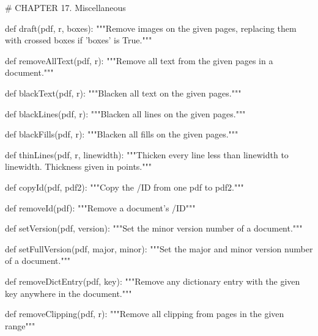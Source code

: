 # CHAPTER 17. Miscellaneous

def draft(pdf, r, boxes):
    """Remove images on the given pages, replacing
    them with crossed boxes if 'boxes' is True."""

def removeAllText(pdf, r):
    """Remove all text from the given pages in a document."""

def blackText(pdf, r):
    """Blacken all text on the given pages."""

def blackLines(pdf, r):
    """Blacken all lines on the given pages."""

def blackFills(pdf, r):
    """Blacken all fills on the given pages."""

def thinLines(pdf, r, linewidth):
    """Thicken every line less than
    linewidth to linewidth. Thickness given in points."""

def copyId(pdf, pdf2):
    """Copy the /ID from one pdf to pdf2."""

def removeId(pdf):
    """Remove a document's /ID"""

def setVersion(pdf, version):
    """Set the minor version number of a document."""

def setFullVersion(pdf, major, minor):
    """Set the major and minor version number of
    a document."""

def removeDictEntry(pdf, key):
    """Remove any dictionary entry with the given
    key anywhere in the document."""

def removeClipping(pdf, r):
    """Remove all clipping from pages in the given range"""
